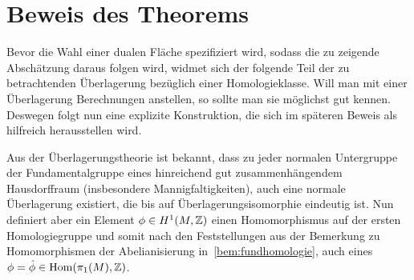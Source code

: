 \section{Beweis des Theorems}

Bevor die Wahl einer dualen Fläche spezifiziert wird, sodass die zu zeigende Abschätzung daraus folgen wird, widmet sich der folgende Teil der zu betrachtenden Überlagerung bezüglich einer Homologieklasse. Will man mit einer Überlagerung Berechnungen anstellen, so sollte man sie möglichst gut kennen. Deswegen folgt nun eine explizite Konstruktion, die sich im späteren Beweis als hilfreich herausstellen wird.

\begin{constr}
	\label{constr:cut}
	Aus der Überlagerungstheorie ist bekannt, dass zu jeder normalen Untergruppe der Fundamentalgruppe eines hinreichend gut zusammenhängendem Hausdorffraum (insbesondere Mannigfaltigkeiten), auch eine normale Überlagerung existiert, die bis auf Überlagerungsisomorphie eindeutig ist. Nun definiert aber ein Element $\phi\in H^1(M,\mathbb{Z})$ einen Homomorphismus auf der ersten Homologiegruppe und somit nach den Feststellungen aus der Bemerkung zu Homomorphismen der Abelianisierung in~\ref{bem:fundhomologie}, auch eines $\phi = \hat \phi \in \operatorname{Hom}(\pi_1(M),\mathbb{Z})$. 


\end{constr}
